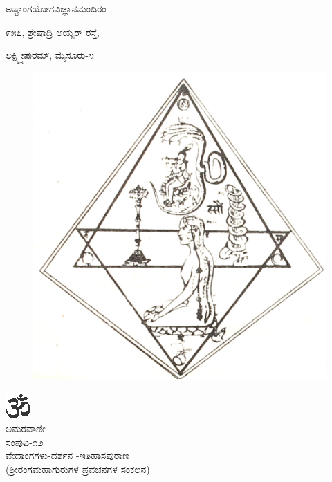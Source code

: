 \vskip -10pt

\begin{center}

{\large ಅಷ್ಟಾಂಗಯೋಗವಿಜ್ಞಾನಮಂದಿರಂ}

{\normalsize ೯೫೭, ಶ್ರೇಷಾದ್ರಿ ಅಯ್ಯರ್ ರಸ್ತೆ,}

{\normalsize ಲಕ್ಷ್ಮ್ನೀಪುರಮ್, ಮೈಸೂರು-೪}

\end{center}

\newpage

\begin{figure}[h]
\centerline
{\includegraphics[scale=.18]{0000b.eps}}
\end{figure}

\begin{center}
{\includegraphics[scale=1.5]{om.eps}}\\[5pt]

{\large ಅಮರವಾಣೀ}\\[5pt]

{\normalsize ಸಂಪುಟ-೧೨}\\[5pt]

{\large ವೇದಾಂಗಗಳು-ದರ್ಶನ -ಇತಿಹಾಸಪುರಾಣ}\\[5pt]

{\normalsize (ಶ್ರೀರಂಗಮಹಾಗುರುಗಳ ಪ್ರವಚನಗಳ ಸಂಕಲನ)}
\end{center}

